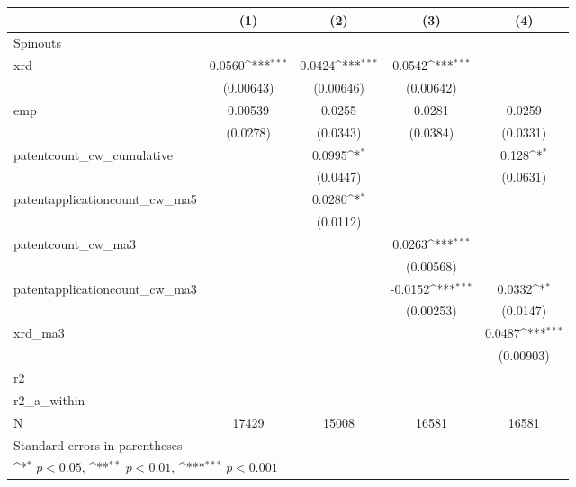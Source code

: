 {
\def\sym#1{\ifmmode^{#1}\else\(^{#1}\)\fi}
\begin{tabular}{l*{4}{c}}
\hline\hline
            &\multicolumn{1}{c}{(1)}         &\multicolumn{1}{c}{(2)}         &\multicolumn{1}{c}{(3)}         &\multicolumn{1}{c}{(4)}         \\
\hline
Spinouts    &                     &                     &                     &                     \\
xrd         &      0.0560\sym{***}&      0.0424\sym{***}&      0.0542\sym{***}&                     \\
            &   (0.00643)         &   (0.00646)         &   (0.00642)         &                     \\
[1em]
emp         &     0.00539         &      0.0255         &      0.0281         &      0.0259         \\
            &    (0.0278)         &    (0.0343)         &    (0.0384)         &    (0.0331)         \\
[1em]
patentcount\_cw\_cumulative&                     &      0.0995\sym{*}  &                     &       0.128\sym{*}  \\
            &                     &    (0.0447)         &                     &    (0.0631)         \\
[1em]
patentapplicationcount\_cw\_ma5&                     &      0.0280\sym{*}  &                     &                     \\
            &                     &    (0.0112)         &                     &                     \\
[1em]
patentcount\_cw\_ma3&                     &                     &      0.0263\sym{***}&                     \\
            &                     &                     &   (0.00568)         &                     \\
[1em]
patentapplicationcount\_cw\_ma3&                     &                     &     -0.0152\sym{***}&      0.0332\sym{*}  \\
            &                     &                     &   (0.00253)         &    (0.0147)         \\
[1em]
xrd\_ma3     &                     &                     &                     &      0.0487\sym{***}\\
            &                     &                     &                     &   (0.00903)         \\
\hline
r2          &                     &                     &                     &                     \\
r2\_a\_within &                     &                     &                     &                     \\
N           &       17429         &       15008         &       16581         &       16581         \\
\hline\hline
\multicolumn{5}{l}{\footnotesize Standard errors in parentheses}\\
\multicolumn{5}{l}{\footnotesize \sym{*} \(p<0.05\), \sym{**} \(p<0.01\), \sym{***} \(p<0.001\)}\\
\end{tabular}
}

